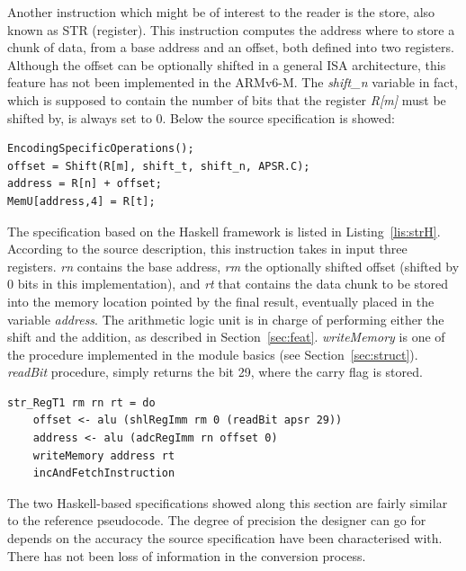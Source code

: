 \documentclass[conference]{IEEEtran}
\begin{document}
Another instruction which might be of interest to the reader is the store, also known as STR
(register). This instruction computes the address where to store a chunk of data, from a base
address and an offset, both defined into two registers. Although the offset can be optionally
shifted in a general ISA architecture, this feature has not been implemented in the ARMv6-M.
The \textit{shift\_n} variable in fact, which is supposed to contain the number of bits that
the register \textit{R[m]} must be shifted by, is always set to 0. Below the source
specification is showed:\\

\begin{lstlisting}[caption=STR (register) instruction - Reference specification,
frame=single, label=lis:str]
EncodingSpecificOperations();
offset = Shift(R[m], shift_t, shift_n, APSR.C);
address = R[n] + offset;
MemU[address,4] = R[t];
\end{lstlisting}

\noindent
The specification based on the Haskell framework is listed in Listing~\ref{lis:strH}.
According to the source description, this instruction takes in input three registers.
\textit{rn} contains the base address, \textit{rm} the optionally shifted offset (shifted by
0 bits in this implementation), and \textit{rt} that contains the data chunk to be stored
into the memory location pointed by the final result, eventually placed in the variable
\textit{address}. The arithmetic logic unit is in charge of performing either the shift and
the addition, as described in Section~\ref{sec:feat}. \textit{writeMemory} is one of the
procedure implemented in the module basics (see Section~\ref{sec:struct}). \textit{readBit}
procedure, simply returns the bit 29, where the carry flag is stored.\\

\begin{lstlisting}[caption=STR (register) instruction - Haskell-based specification,
frame=single, label=lis:strH]
str_RegT1 rm rn rt = do
    offset <- alu (shlRegImm rm 0 (readBit apsr 29))
    address <- alu (adcRegImm rn offset 0)
    writeMemory address rt
    incAndFetchInstruction
\end{lstlisting}

The two Haskell-based specifications showed along this section are fairly similar to the
reference pseudocode. The degree of precision the designer can go for depends on the accuracy
the source specification have been characterised with. There has not been loss of
information in the conversion process.
\end{document}
